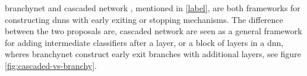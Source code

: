 \gls{branchynet} \cite{teerapittayanon_branchynet:_2016} and cascaded network \cite{leroux_resource-constrained_2015}, mentioned in \ref{label}, are both frameworks for constructing \gls{dnn}s with early exiting or stopping mechanisms. The difference between the two proposals are, cascaded network are seen as a general framework for adding intermediate classifiers after a layer, or a block of layers in a \gls{dnn}, wheres \gls{branchynet} construct early exit branches with additional layers, see figure \ref{fig:cascaded-vs-branchy}.

\begin{figure}
	\centering

\end{figure}
